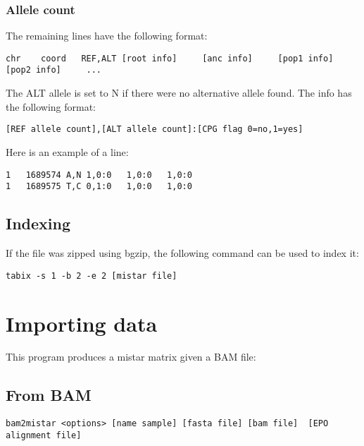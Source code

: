 \documentclass[a4paper]{article}
\begin{document}
\subsubsection{Allele count}

\noindent The remaining lines have the following format:

\begin{verbatim}
chr    coord   REF,ALT [root info]     [anc info]     [pop1 info]     [pop2 info]     ...
\end{verbatim}

\noindent  The ALT allele is set to N if there were no alternative allele found. The info has the following format:

\begin{verbatim}
[REF allele count],[ALT allele count]:[CPG flag 0=no,1=yes]
\end{verbatim}

\noindent  Here is an example of a line:

\begin{verbatim}
1	1689574	A,N	1,0:0	1,0:0	1,0:0
1	1689575	T,C	0,1:0	1,0:0	1,0:0
\end{verbatim}





\subsection{Indexing}

\noindent If the file was zipped using bgzip, the following command can be used to index it:
\begin{verbatim}
tabix -s 1 -b 2 -e 2 [mistar file]
\end{verbatim}




\section{Importing data}

This program produces a  mistar matrix given a BAM file:

\subsection{From BAM}

\small
\begin{verbatim} 
bam2mistar <options> [name sample] [fasta file] [bam file]  [EPO alignment file]
\end{verbatim} 
\normalsize
\end{document}
